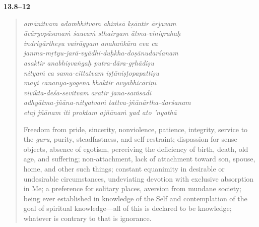 \par\noindent\textbf{13.8–12}\par
\begin{verse}
\textit{amānitvam adambhitvam ahiṁsā kṣāntir ārjavam} \\
\textit{ācāryopāsanaṁ śaucaṁ sthairyam ātma-vinigrahaḥ} \\
\textit{indriyārtheṣu vairāgyam anahaṅkāra eva ca} \\
\textit{janma-mṛtyu-jarā-vyādhi-duḥkha-doṣānudarśanam} \\
\textit{asaktir anabhiṣvaṅgaḥ putra-dāra-gṛhādiṣu} \\
\textit{nityaṁ ca sama-cittatvam iṣṭāniṣṭopapattiṣu} \\
\textit{mayi cānanya-yogena bhaktir avyabhicāriṇī} \\
\textit{vivikta-deśa-sevitvam aratir jana-saṁsadi} \\
\textit{adhyātma-jñāna-nityatvaṁ tattva-jñānārtha-darśanam} \\
\textit{etaj jñānam iti proktam ajñānaṁ yad ato ’nyathā}

\noindent Freedom from pride, sincerity, nonviolence, patience, integrity, service to the \textit{guru}, purity, steadfastness, and self-restraint; dispassion for sense objects, absence of egotism, perceiving the deficiency of birth, death, old age, and suffering; non-attachment, lack of attachment toward son, spouse, home, and other such things; constant equanimity in desirable or undesirable circumstances, undeviating devotion with exclusive absorption in Me; a preference for solitary places, aversion from mundane society; being ever established in knowledge of the Self and contemplation of the goal of spiritual knowledge---all of this is declared to be knowledge; whatever is contrary to that is ignorance.
\end{verse}
\par


